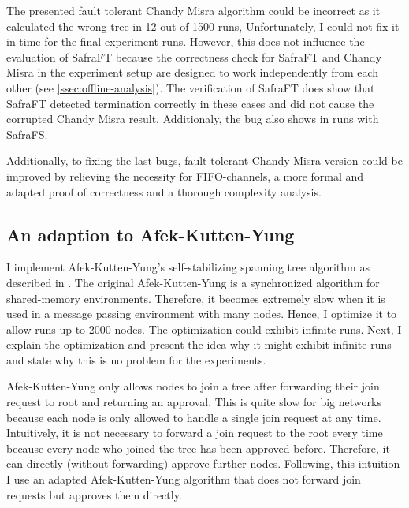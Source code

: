 The presented fault tolerant Chandy Misra algorithm could be incorrect as it calculated the wrong tree in 12 out of 1500 runs, 
Unfortunately, I could not fix it in time for the final experiment runs. 
However, this does not influence the evaluation of SafraFT because the correctness check for SafraFT and Chandy Misra in the experiment setup are designed to work independently from each other (see \cref{ssec:offline-analysis}).
The verification of SafraFT does show that SafraFT detected termination correctly in these cases and did not cause the corrupted Chandy Misra result.
Additionaly, the bug also shows in runs with SafraFS.

Additionally, to fixing the last bugs, fault-tolerant Chandy Misra version could be improved by relieving the necessity for FIFO-channels, a more formal and adapted proof of correctness and a thorough complexity analysis. 

\subsection{An adaption to Afek-Kutten-Yung}
I implement Afek-Kutten-Yung's self-stabilizing spanning tree algorithm as described in \cite[page 183ff]{fokkink:2018}.
The original Afek-Kutten-Yung is a synchronized algorithm for shared-memory environments.
Therefore, it becomes extremely slow when it is used in a message passing environment with many nodes.
Hence, I optimize it to allow runs up to 2000 nodes.
The optimization could exhibit infinite runs.
Next, I explain the optimization and present the idea why it might exhibit infinite runs and state why this is no problem for the experiments.

Afek-Kutten-Yung only allows nodes to join a tree after forwarding their join request to root and returning an approval.
This is quite slow for big networks because each node is only allowed to handle a single join request at any time.
Intuitively, it is not necessary to forward a join request to the root every time because every node who joined the tree has been approved before.
Therefore, it can directly (without forwarding) approve further nodes.
Following, this intuition I use an adapted Afek-Kutten-Yung algorithm that does not forward join requests but approves them directly.

